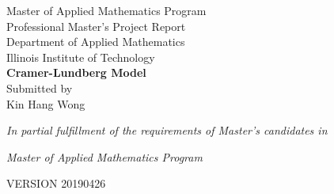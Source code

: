 \documentclass[12pt]{article}
\begin{document}
\begin{center}
{Master of Applied Mathematics Program}\\
{Professional Master's Project Report}\\
{Department of Applied Mathematics}\\
{Illinois Institute of Technology}\\
\vspace{4.5 cm}
{\Large \bf Cramer-Lundberg Model}\\
\vspace{4.5 cm} 
{\Large Submitted by}\\
\vspace{0.5 cm}
{\Large Kin Hang Wong}\\
\vspace{7cm} 
\centerline{\emph{In
partial fulfillment of the requirements of Master's candidates in}} 
\centerline{\emph{Master of Applied 
Mathematics Program}}
\vspace{.1in}

\vspace{.1in}
\centerline{VERSION 20190426}
\end{center}
\thispagestyle{empty}
\newpage
\begin{abstract}

This project explained the mathematical structure of the Cramer-Lundberg Model which is widely used by insurance industry. \\

The simplest form of the model only consists initial capital, constant premium rate and an assumed claims distribution. It is not enough for practical use for business. Therefore, throughout the derivation of the model, one should seek possibilities to implement additional features.\\

One of the most intuitive and important feature is to implement investment income from bonds. Assuming the investment return is constant throughout the time horizon, i.e. no interest rate risk and no reinvestment risk,  the model behaves differently compare with no investments. \textcolor{red}{(to be continued).....}\\

This project will also perform simulation using R to better understand the model, \textcolor{red}{(to be continued).....}\\

\end{abstract}
\end{document}
